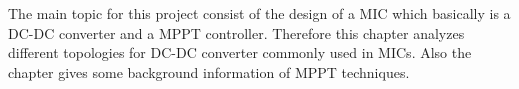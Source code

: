 The main topic for this project consist of the design of a MIC which basically is a DC-DC converter and a MPPT controller. Therefore this chapter analyzes different topologies for DC-DC converter commonly used in MICs. Also the chapter gives some background information of MPPT techniques.

